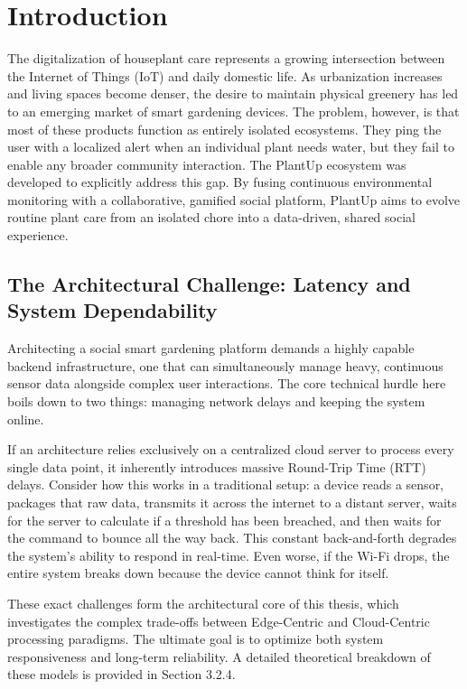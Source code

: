 \section{Introduction}

The digitalization of houseplant care represents a growing intersection between the Internet of Things (IoT) and daily domestic life. As urbanization increases and living spaces become denser, the desire to maintain physical greenery has led to an emerging market of smart gardening devices. The problem, however, is that most of these products function as entirely isolated ecosystems. They ping the user with a localized alert when an individual plant needs water, but they fail to enable any broader community interaction. The PlantUp ecosystem was developed to explicitly address this gap. By fusing continuous environmental monitoring with a collaborative, gamified social platform, PlantUp aims to evolve routine plant care from an isolated chore into a data-driven, shared social experience.

\subsection{The Architectural Challenge: Latency and System Dependability}

Architecting a social smart gardening platform demands a highly capable backend infrastructure, one that can simultaneously manage heavy, continuous sensor data alongside complex user interactions. The core technical hurdle here boils down to two things: managing network delays and keeping the system online.

If an architecture relies exclusively on a centralized cloud server to process every single data point, it inherently introduces massive Round-Trip Time (RTT) delays. Consider how this works in a traditional setup: a device reads a sensor, packages that raw data, transmits it across the internet to a distant server, waits for the server to calculate if a threshold has been breached, and then waits for the command to bounce all the way back. This constant back-and-forth degrades the system's ability to respond in real-time. Even worse, if the Wi-Fi drops, the entire system breaks down because the device cannot think for itself.

These exact challenges form the architectural core of this thesis, which investigates the complex trade-offs between Edge-Centric and Cloud-Centric processing paradigms. The ultimate goal is to optimize both system responsiveness and long-term reliability. A detailed theoretical breakdown of these models is provided in Section 3.2.4.

